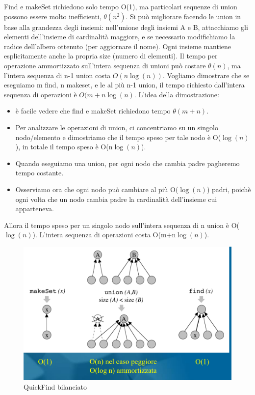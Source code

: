 \documentclass{article}
\begin{document}
Find e makeSet richiedono solo tempo O(1), ma particolari sequenze di union possono essere molto inefficienti, $\theta (n^2)$. \newline 
Si può migliorare facendo le union in base alla grandezza degli insiemi: \newline
nell'unione degli insiemi A e B, attacchiamo gli elementi dell'insieme di cardinalità maggiore, e se necessario modifichiamo la radice dell'albero ottenuto (per aggiornare il nome). Ogni insieme mantiene esplicitamente anche la propria size (numero di elementi).
Il tempo per operazione ammortizzato sull'intera sequenza di unioni può costare $\theta(n)$, ma l'intera sequenza di n-1 union costa $O(n \log(n))$.
Vogliamo dimostrare che se eseguiamo m find, n makeset, e le al più n-1 union, il tempo richiesto dall'intera sequenza di operazioni è $O(m+n\log(n)$. L'idea della dimostrazione:
\begin{itemize}
    \item è facile vedere che find e makeSet richiedono tempo $\theta(m+n)$.
    \item Per analizzare le operazioni di union, ci concentriamo su un singolo nodo/elemento e dimostriamo che il tempo speso per tale nodo è O($\log(n)$), in totale il tempo speso è O(n$\log(n)$).
    \item Quando eseguiamo una union, per ogni nodo che cambia padre pagheremo tempo costante.
    \item Osserviamo ora che ogni nodo può cambiare al più O($\log(n)$) padri, poichè ogni volta che un nodo cambia padre la cardinalità dell'insieme cui apparteneva.
\end{itemize}
Allora il tempo speso per un singolo nodo sull'intera sequenza di n union è O($\log(n)$).
L'intera sequenza di operazioni costa O(m+n$\log(n)$).
\begin{figure}
    \centering
    \includegraphics[width=0.5\linewidth]{quickFindBilanciato.png}
    \caption{QuickFind bilanciato}
   \label{fig:enter-label}
\end{figure}
\end{document}
